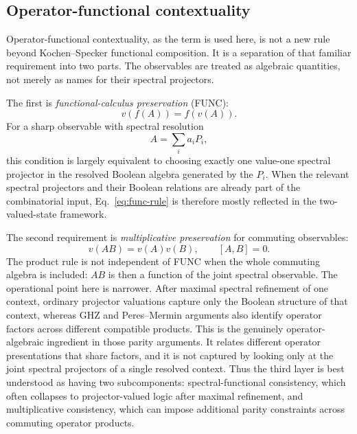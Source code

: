 \documentclass[aps,pra,twocolumn,superscriptaddress,nofootinbib]{revtex4-2}
\begin{document}
\subsection{Operator-functional contextuality}

Operator-functional contextuality, as the term is used here, is not a new rule beyond Kochen--Specker functional composition.  It is a separation of that familiar requirement into two parts.  The observables are treated as algebraic quantities, not merely as names for their spectral projectors.

The first is \emph{functional-calculus preservation} (FUNC):
\begin{equation}
        v(f(A))=f(v(A)).
        \label{eq:func-rule}
\end{equation}
For a sharp observable with spectral resolution
\begin{equation}
        A=\sum_i a_iP_i,
\end{equation}
this condition is largely equivalent to choosing exactly one value-one spectral projector in the resolved Boolean algebra generated by the $P_i$.  When the relevant spectral projectors and their Boolean relations are already part of the combinatorial input, Eq.~\eqref{eq:func-rule} is therefore mostly reflected in the two-valued-state framework.

The second requirement is \emph{multiplicative preservation} for commuting observables:
\begin{equation}
        v(AB)=v(A)v(B),
        \qquad [A,B]=0.
        \label{eq:product-rule}
\end{equation}
The product rule is not independent of FUNC when the whole commuting algebra is included: \(AB\) is then a function of the joint spectral observable.  The operational point here is narrower.  After maximal spectral refinement of one context, ordinary projector valuations capture only the Boolean structure of that context, whereas GHZ and Peres--Mermin arguments also identify operator factors across different compatible products.  This is the genuinely operator-algebraic ingredient in those parity arguments.  It relates different operator presentations that share factors, and it is not captured by looking only at the joint spectral projectors of a single resolved context.  Thus the third layer is best understood as having two subcomponents: spectral-functional consistency, which often collapses to projector-valued logic after maximal refinement, and multiplicative consistency, which can impose additional parity constraints across commuting operator products.
\end{document}
